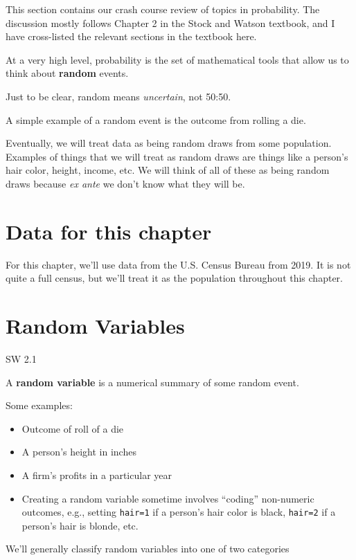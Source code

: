 \documentclass[
  letterpaper,
  DIV=11,
  numbers=noendperiod]{scrreprt}
\begin{document}
This section contains our crash course review of topics in probability.
The discussion mostly follows Chapter 2 in the Stock and Watson
textbook, and I have cross-listed the relevant sections in the textbook
here.

At a very high level, probability is the set of mathematical tools that
allow us to think about \textbf{random} events.

Just to be clear, random means \emph{uncertain}, not 50:50.

A simple example of a random event is the outcome from rolling a die.

Eventually, we will treat data as being random draws from some
population. Examples of things that we will treat as random draws are
things like a person's hair color, height, income, etc. We will think of
all of these as being random draws because \emph{ex ante} we don't know
what they will be.

\section{Data for this chapter}\label{data-for-this-chapter}

For this chapter, we'll use data from the U.S. Census Bureau from 2019.
It is not quite a full census, but we'll treat it as the population
throughout this chapter.

\section{Random Variables}\label{random-variables}

SW 2.1

A \textbf{random variable} is a numerical summary of some random event.

Some examples:

\begin{itemize}
\item
  Outcome of roll of a die
\item
  A person's height in inches
\item
  A firm's profits in a particular year
\item
  Creating a random variable sometime involves ``coding'' non-numeric
  outcomes, e.g., setting \texttt{hair=1} if a person's hair color is
  black, \texttt{hair=2} if a person's hair is blonde, etc.
\end{itemize}

We'll generally classify random variables into one of two categories
\end{document}
